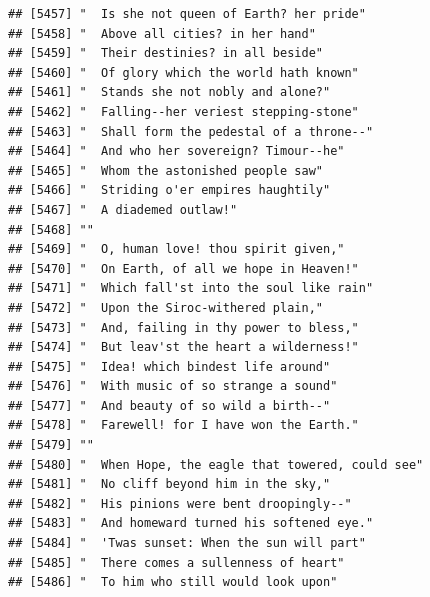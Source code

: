 \documentclass{article}\usepackage[]{graphicx}\usepackage[]{color}
\makeatletter
\newenvironment{kframe}{%
 \def\at@end@of@kframe{}%
 \ifinner\ifhmode%
  \def\at@end@of@kframe{\end{minipage}}%
  \begin{minipage}{\columnwidth}%
 \fi\fi%
 \def\FrameCommand##1{\hskip\@totalleftmargin \hskip-\fboxsep
 \colorbox{shadecolor}{##1}\hskip-\fboxsep
     \hskip-\linewidth \hskip-\@totalleftmargin \hskip\columnwidth}%
 \MakeFramed {\advance\hsize-\width
   \@totalleftmargin\z@ \linewidth\hsize
   \@setminipage}}%
 {\par\unskip\endMakeFramed%
 \at@end@of@kframe}
\newenvironment{knitrout}{}{} %
\makeatother
\begin{document}
\begin{knitrout}
\begin{kframe}
\begin{verbatim}
## [5457] "  Is she not queen of Earth? her pride"                                      
## [5458] "  Above all cities? in her hand"                                             
## [5459] "  Their destinies? in all beside"                                            
## [5460] "  Of glory which the world hath known"                                       
## [5461] "  Stands she not nobly and alone?"                                           
## [5462] "  Falling--her veriest stepping-stone"                                       
## [5463] "  Shall form the pedestal of a throne--"                                     
## [5464] "  And who her sovereign? Timour--he"                                         
## [5465] "  Whom the astonished people saw"                                            
## [5466] "  Striding o'er empires haughtily"                                           
## [5467] "  A diademed outlaw!"                                                        
## [5468] ""                                                                            
## [5469] "  O, human love! thou spirit given,"                                         
## [5470] "  On Earth, of all we hope in Heaven!"                                       
## [5471] "  Which fall'st into the soul like rain"                                     
## [5472] "  Upon the Siroc-withered plain,"                                            
## [5473] "  And, failing in thy power to bless,"                                       
## [5474] "  But leav'st the heart a wilderness!"                                       
## [5475] "  Idea! which bindest life around"                                           
## [5476] "  With music of so strange a sound"                                          
## [5477] "  And beauty of so wild a birth--"                                           
## [5478] "  Farewell! for I have won the Earth."                                       
## [5479] ""                                                                            
## [5480] "  When Hope, the eagle that towered, could see"                              
## [5481] "  No cliff beyond him in the sky,"                                           
## [5482] "  His pinions were bent droopingly--"                                        
## [5483] "  And homeward turned his softened eye."                                     
## [5484] "  'Twas sunset: When the sun will part"                                      
## [5485] "  There comes a sullenness of heart"                                         
## [5486] "  To him who still would look upon"                                          

\end{verbatim}
\end{kframe}
\end{knitrout}
\end{document}
